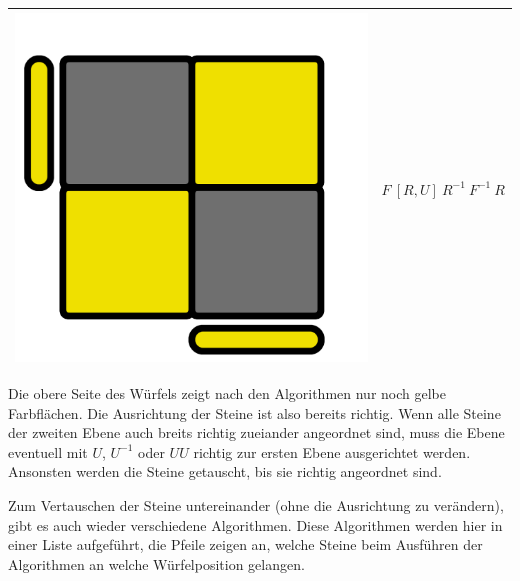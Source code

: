 \documentclass[12pt,a4paper, usenames, dvipsnames]{article}
\theoremstyle{mystyle}
\theoremstyle{definition}
\begin{document}
\begin{center}
\begin{tabular}{m{4cm} m{6cm}}
\includegraphics[scale=0.08]{TOPVIEW6.png} & $F \ [ R,U ]\ R^{-1} \ F^{-1}\ R$ \\
\bottomrule
\end{tabular}
\end{center}


Die obere Seite des Würfels zeigt nach den Algorithmen nur noch gelbe Farbflächen. Die Ausrichtung der Steine ist also bereits richtig. Wenn alle Steine der zweiten Ebene auch breits richtig zueiander angeordnet sind, muss die Ebene eventuell mit $U$, $U^{-1}$ oder $UU$ richtig zur ersten Ebene ausgerichtet werden.  Ansonsten werden die Steine getauscht, bis sie richtig angeordnet sind.

Zum Vertauschen der Steine untereinander (ohne die Ausrichtung zu verändern), gibt es auch wieder verschiedene Algorithmen. Diese Algorithmen werden hier in einer Liste aufgeführt, die Pfeile zeigen an, welche Steine beim Ausführen der Algorithmen an welche Würfelposition gelangen.
\end{document}
